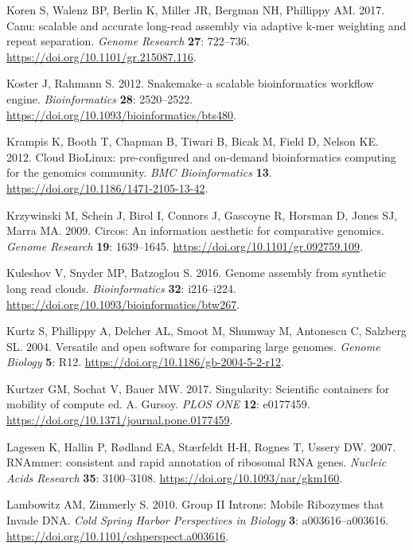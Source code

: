 \documentclass[
  12pt,
  oneside,
  openany]{book}
\begin{document}
\leavevmode\hypertarget{ref-Koren_2017}{}%
Koren S, Walenz BP, Berlin K, Miller JR, Bergman NH, Phillippy AM. 2017. Canu: scalable and accurate long-read assembly via adaptive k-mer weighting and repeat separation. \emph{Genome Research} \textbf{27}: 722--736. \url{https://doi.org/10.1101/gr.215087.116}.

\leavevmode\hypertarget{ref-Koster_2012}{}%
Koster J, Rahmann S. 2012. Snakemake--a scalable bioinformatics workflow engine. \emph{Bioinformatics} \textbf{28}: 2520--2522. \url{https://doi.org/10.1093/bioinformatics/bts480}.

\leavevmode\hypertarget{ref-Krampis_2012}{}%
Krampis K, Booth T, Chapman B, Tiwari B, Bicak M, Field D, Nelson KE. 2012. Cloud BioLinux: pre-configured and on-demand bioinformatics computing for the genomics community. \emph{BMC Bioinformatics} \textbf{13}. \url{https://doi.org/10.1186/1471-2105-13-42}.

\leavevmode\hypertarget{ref-Krzywinski_2009}{}%
Krzywinski M, Schein J, Birol I, Connors J, Gascoyne R, Horsman D, Jones SJ, Marra MA. 2009. Circos: An information aesthetic for comparative genomics. \emph{Genome Research} \textbf{19}: 1639--1645. \url{https://doi.org/10.1101/gr.092759.109}.

\leavevmode\hypertarget{ref-Kuleshov_2016}{}%
Kuleshov V, Snyder MP, Batzoglou S. 2016. Genome assembly from synthetic long read clouds. \emph{Bioinformatics} \textbf{32}: i216--i224. \url{https://doi.org/10.1093/bioinformatics/btw267}.

\leavevmode\hypertarget{ref-Kurtz_2004}{}%
Kurtz S, Phillippy A, Delcher AL, Smoot M, Shumway M, Antonescu C, Salzberg SL. 2004. Versatile and open software for comparing large genomes. \emph{Genome Biology} \textbf{5}: R12. \url{https://doi.org/10.1186/gb-2004-5-2-r12}.

\leavevmode\hypertarget{ref-Kurtzer_2017}{}%
Kurtzer GM, Sochat V, Bauer MW. 2017. Singularity: Scientific containers for mobility of compute ed. A. Gursoy. \emph{PLOS ONE} \textbf{12}: e0177459. \url{https://doi.org/10.1371/journal.pone.0177459}.

\leavevmode\hypertarget{ref-Lagesen_2007}{}%
Lagesen K, Hallin P, Rødland EA, Stærfeldt H-H, Rognes T, Ussery DW. 2007. RNAmmer: consistent and rapid annotation of ribosomal RNA genes. \emph{Nucleic Acids Research} \textbf{35}: 3100--3108. \url{https://doi.org/10.1093/nar/gkm160}.

\leavevmode\hypertarget{ref-Lambowitz_2010}{}%
Lambowitz AM, Zimmerly S. 2010. Group II Introns: Mobile Ribozymes that Invade DNA. \emph{Cold Spring Harbor Perspectives in Biology} \textbf{3}: a003616--a003616. \url{https://doi.org/10.1101/cshperspect.a003616}.
\end{document}
